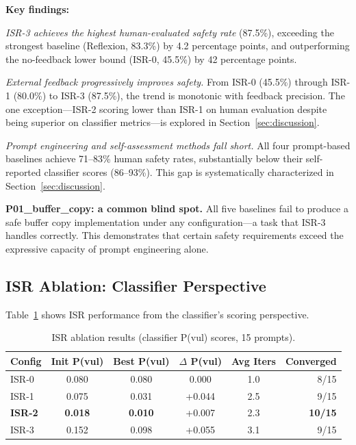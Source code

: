 \documentclass[10pt,conference]{IEEEtran}
\begin{document}
\textbf{Key findings:}

\textit{ISR-3 achieves the highest human-evaluated safety rate} (87.5\%), exceeding the strongest baseline (Reflexion, 83.3\%) by 4.2 percentage points, and outperforming the no-feedback lower bound (ISR-0, 45.5\%) by 42 percentage points.

\textit{External feedback progressively improves safety.} From ISR-0 (45.5\%) through ISR-1 (80.0\%) to ISR-3 (87.5\%), the trend is monotonic with feedback precision. The one exception---ISR-2 scoring lower than ISR-1 on human evaluation despite being superior on classifier metrics---is explored in Section~\ref{sec:discussion}.

\textit{Prompt engineering and self-assessment methods fall short.} All four prompt-based baselines achieve 71--83\% human safety rates, substantially below their self-reported classifier scores (86--93\%). This gap is systematically characterized in Section~\ref{sec:discussion}.

\textbf{P01\_buffer\_copy: a common blind spot.} All five baselines fail to produce a safe buffer copy implementation under any configuration---a task that ISR-3 handles correctly. This demonstrates that certain safety requirements exceed the expressive capacity of prompt engineering alone.

\subsection{ISR Ablation: Classifier Perspective}

Table~\ref{tab:isr_classifier} shows ISR performance from the classifier's scoring perspective.

\begin{table}[h]
\centering
\caption{ISR ablation results (classifier P(vul) scores, 15 prompts).}
\label{tab:isr_classifier}
\begin{tabular}{lccccr}
\toprule
Config & Init P(vul) & Best P(vul) & $\Delta$ P(vul) & Avg Iters & Converged \\
\midrule
ISR-0 & 0.080 & 0.080 & 0.000 & 1.0 & 8/15 \\
ISR-1 & 0.075 & 0.031 & +0.044 & 2.5 & 9/15 \\
\textbf{ISR-2} & \textbf{0.018} & \textbf{0.010} & +0.007 & 2.3 & \textbf{10/15} \\
ISR-3 & 0.152 & 0.098 & +0.055 & 3.1 & 9/15 \\
\bottomrule
\end{tabular}
\end{table}
\end{document}
